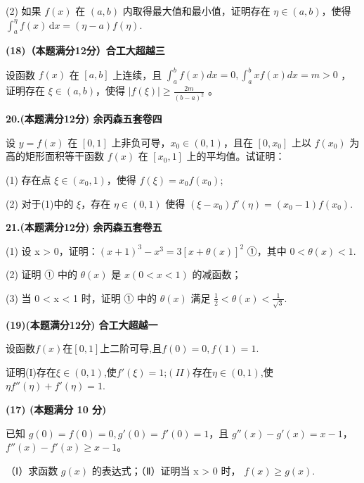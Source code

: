 \documentclass[a4paper,12pt]{article}
\begin{document}
(2) 如果 $ f(x) $ 在 $(a, b)$ 内取得最大值和最小值，证明存在 $\eta \in (a, b)$，使得 $\int_{a}^{\eta} f(x) \, \mathrm{d}x = (\eta - a) f(\eta)$.

\vspace{0.5cm}

\textbf{(18)（本题满分12分）合工大超越三}

设函数 $f(x)$ 在 $[a,b]$ 上连续，且 $\int_{a}^{b}f(x)dx=0,\int_{a}^{b}xf(x)dx=m>0$ ，证明存在 $\xi\in(a,b)$，使得 $\left|f(\xi)\right|\geqslant\frac{2m}{(b-a)^{2}}$ 。

\vspace{0.5cm}

\textbf{20.(本题满分12分) 余丙森五套卷四}

设 $y=f(x)$ 在 $[0,1]$ 上非负可导，$x_{0}\in(0,1)$，且在 $[0,x_{0}]$ 上以 $f(x_{0})$ 为高的矩形面积等干函数 $f(x)$ 在 $[x_{0},1]$ 上的平均值。试证明：

(1) 存在点 $\xi \in (x_{0}, 1)$，使得 $f(\xi) = x_{0} f(x_{0})$;

(2) 对于(1)中的 $\xi$，存在 $\eta \in (0,1)$ 使得 $(\xi - x_{0})f'(\eta) = (x_{0} - 1)f(x_{0})$.

\vspace{0.5cm}

\textbf{21.(本题满分12分) 余丙森五套卷五}

(1) 设 x > 0，证明：$(x + 1)^{3} - x^{3} = 3[x + \theta(x)]^{2}$ ①，其中 $0 < \theta(x) < 1$.

(2) 证明 ① 中的 $\theta(x)$ 是 $x (0 < x < 1)$ 的减函数；

(3) 当 0 < x < 1 时，证明 ① 中的 $\theta(x)$ 满足 $\frac{1}{2} < \theta(x) < \frac{1}{\sqrt{3}}$.

\vspace{0.5cm}

\textbf{(19)(本题满分12分) 合工大超越一}

设函数$f(x)$在$[0,1]$上二阶可导,且$f(0)=0,f(1)=1$.

证明(I)存在$\xi\in(0,1)$,使$f'(\xi)=1$;$(II)$存在$\eta\in(0,1)$,使$\eta f''(\eta)+f'(\eta)=1$.

\vspace{0.5cm}

\textbf{(17) (本题满分 10 分)}

已知 $g(0)=f(0)=0, g'(0)=f'(0)=1$，且 $g''(x)-g'(x)=x-1$， $f''(x)-f'(x)\geqslant x-1$。

（Ⅰ）求函数 $g(x)$ 的表达式；（Ⅱ）证明当 x > 0 时， $f(x) \geqslant g(x)$.

\vspace{0.5cm}
\end{document}
